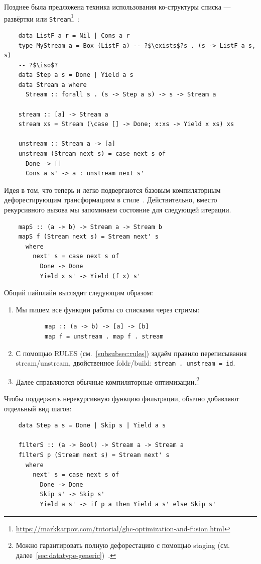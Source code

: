 Позднее была предложена техника использования ко-структуры списка --- развёртки или \texttt{Stream}\footnote{\url{https://markkarpov.com/tutorial/ghc-optimization-and-fusion.html}}~\cite{coutts2007stream}:
\begin{verbatim}
    data ListF a r = Nil | Cons a r
    type MyStream a = Box (ListF a) -- ?$\exists$?s . (s -> ListF a s, s)
    -- ?$\iso$?
    data Step a s = Done | Yield a s
    data Stream a where
      Stream :: forall s . (s -> Step a s) -> s -> Stream a

    stream :: [a] -> Stream a
    stream xs = Stream (\case [] -> Done; x:xs -> Yield x xs) xs

    unstream :: Stream a -> [a]
    unstream (Stream next s) = case next s of
      Done -> []
      Cons a s' -> a : unstream next s'
\end{verbatim}

Идея в том, что теперь  и легко подвергаются базовым компиляторным дефорестирующим трансформациям в стиле~\cite{wadler1988deforestation}.
Действительно, вместо рекурсивного вызова мы запоминаем состояние для следующей итерации.
\begin{verbatim}
    mapS :: (a -> b) -> Stream a -> Stream b
    mapS f (Stream next s) = Stream next' s
      where
        next' s = case next s of
          Done -> Done
          Yield x s' -> Yield (f x) s'
\end{verbatim}

Общий пайплайн выглядит следующим образом:
\begin{enumerate}
    \item Мы пишем все функции работы со списками через стримы:
    \begin{verbatim}
        map :: (a -> b) -> [a] -> [b]
        map f = unstream . map f . stream
    \end{verbatim}
    \item С помощью RULES (см.~\ref{subsubsec:rules}) задаём правило переписывания stream/unstream, двойственное foldr/build: \texttt{stream . unstream = id}.
    \item Далее справляются обычные компиляторные оптимизации.\footnote{Можно гарантировать полную дефорестацию с помощью staging (см. далее~\ref{sec:datatype-generic})~\cite{kiselyov2017stream}.}
\end{enumerate}

Чтобы поддержать нерекурсивную функцию фильтрации, обычно добавляют отдельный вид шагов:
\begin{verbatim}
    data Step a s = Done | Skip s | Yield a s

    filterS :: (a -> Bool) -> Stream a -> Stream a
    filterS p (Stream next s) = Stream next' s
      where
        next' s = case next s of
          Done -> Done
          Skip s' -> Skip s'
          Yield a s' -> if p a then Yield a s' else Skip s'
\end{verbatim}

